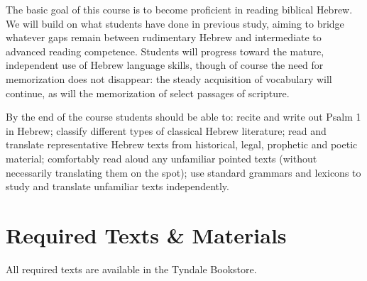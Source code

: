\documentclass[titlepage]{article}
\begin{document}
The basic goal of this course is to become proficient in reading
biblical Hebrew. We will build on what students have done in previous
study, aiming to bridge whatever gaps remain between rudimentary Hebrew
and intermediate to advanced reading competence. Students will progress
toward the mature, independent use of Hebrew language skills, though of
course the need for memorization does not disappear: the steady
acquisition of vocabulary will continue, as will the memorization of
select passages of scripture.

By the end of the course students should be able to:
  recite and write out Psalm 1 in Hebrew;
  classify different types of classical Hebrew literature;
  read and translate representative Hebrew texts from historical, legal, prophetic and poetic material;
  comfortably read aloud any unfamiliar pointed texts (without necessarily translating them on the spot);
  use standard grammars and lexicons to study and translate unfamiliar texts independently.

\section{Required Texts \& Materials}
\label{texts}

All required texts are available in the Tyndale Bookstore.
\end{document}
